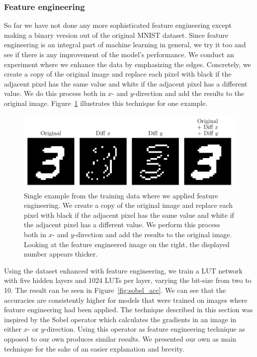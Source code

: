 \subsubsection{Feature engineering} \label{sec:feature_engineering}
So far we have not done any more sophisticated feature engineering except making a binary version out of the original MNIST dataset. Since feature engineering is an integral part of machine learning in general, we try it too and see if there is any improvement of the model's performance. We conduct an experiment where we enhance the data by emphasizing the edges. Concretely, we create a copy of the original image and replace each pixel with black if the adjacent pixel has the same value and white if the adjacent pixel has a different value. We do this process both in $x$- and $y$-direction and add the results to the original image. Figure~\ref{fig:sobel_single} illustrates this technique for one example.

\begin{figure}[!htb]
    \centering
    \includegraphics[width=.9\linewidth]{images/diff.pdf}
    \caption{Single example from the training data where we applied feature engineering. We create a copy of the original image and replace each pixel with black if the adjacent pixel has the same value and white if the adjacent pixel has a different value. We perform this process both in $x$- and $y$-direction and add the results to the original image. Looking at the feature engineered image on the right, the displayed number appears thicker.}
\label{fig:sobel_single}
\end{figure}
\FloatBarrier

\noindent Using the dataset enhanced with feature engineering, we train a LUT network with five hidden layers and 1024 LUTs per layer, varying the bit-size from two to 10. The result can be seen in Figure~\ref{fig:sobel_acc}. We can see that the accuracies are consistently higher for models that were trained on images where feature engineering had been applied. The technique described in this section was inspired by the Sobel operator \cite{bib:sobelsobel} which calculates the gradients in an image in either $x$- or $y$-direction. Using this operator as feature engineering technique as opposed to our own produces similar results. We presented our own as main technique for the sake of an easier explanation and brevity.


